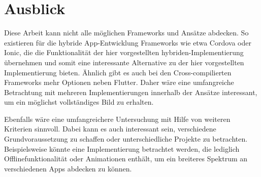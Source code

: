 

\section{Ausblick}
Diese Arbeit kann nicht alle möglichen Frameworks und Ansätze abdecken. So existieren für die hybride App-Entwicklung Frameworks wie etwa Cordova oder Ionic, die die Funktionalität der hier vorgestellten hybriden-Implementierung übernehmen und somit eine interessante Alternative zu der hier vorgestellten Implementierung bieten. Ähnlich gibt es auch bei den Cross-compilierten Frameworks mehr Optionen neben Flutter. Daher wäre eine umfangreiche Betrachtung mit mehreren Implementierungen innerhalb der Ansätze interessant, um ein möglichst vollständiges Bild zu erhalten.

Ebenfalls wäre eine umfangreichere Untersuchung mit Hilfe von weiteren Kriterien sinnvoll. Dabei kann es auch interessant sein, verschiedene Grundvoraussetzung zu schaffen oder unterschiedliche Projekte zu betrachten. Beispielsweise könnte eine Implementierung betrachtet werden, die lediglich Offlinefunktionalität oder Animationen enthält, um ein breiteres Spektrum an verschiedenen Apps abdecken zu können.

